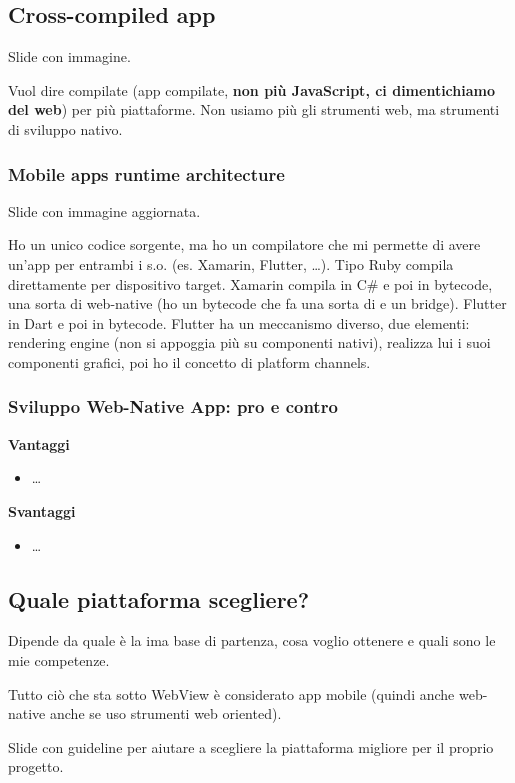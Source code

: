 \subsection{Cross-compiled app}
\par Slide con immagine.
\par Vuol dire compilate (app compilate, \textbf{non più JavaScript, ci dimentichiamo del web}) per più piattaforme. Non usiamo più gli strumenti web, ma strumenti di sviluppo nativo.

\subsubsection{Mobile apps runtime architecture}
\par Slide con immagine aggiornata. 
\par Ho un unico codice sorgente, ma ho un compilatore che mi permette di avere un'app per entrambi i s.o. (es. Xamarin, Flutter, \dots). Tipo Ruby compila direttamente per dispositivo target. Xamarin compila in C\# e poi in bytecode, una sorta di web-native (ho un bytecode che fa una sorta di e un bridge). Flutter in Dart e poi in bytecode. Flutter ha un meccanismo diverso, due elementi: rendering engine (non si appoggia più su componenti nativi), realizza lui i suoi componenti grafici, poi ho il concetto di platform channels.

\subsubsection{Sviluppo Web-Native App: pro e contro}
\par \textbf{Vantaggi}
\begin{itemize}
    \item \dots
\end{itemize}
\par \textbf{Svantaggi}
\begin{itemize}
    \item \dots
\end{itemize}

\subsection{Quale piattaforma scegliere?}
\par Dipende da quale è la ima base di partenza, cosa voglio ottenere e quali sono le mie competenze.
\par Tutto ciò che sta sotto WebView è considerato app mobile (quindi anche web-native anche se uso strumenti web oriented).
\par Slide con guideline per aiutare a scegliere la piattaforma migliore per il proprio progetto.
